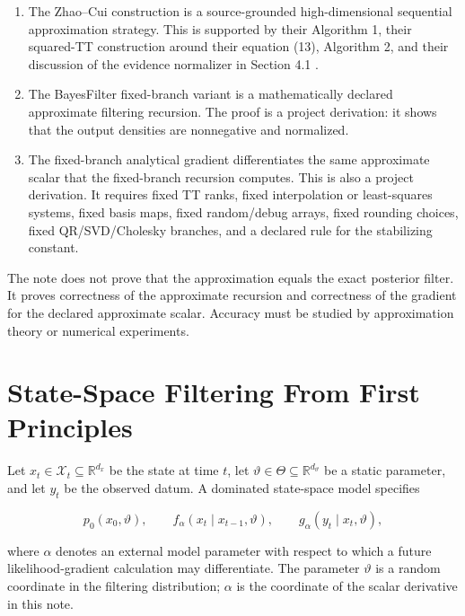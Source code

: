 \documentclass[11pt]{article}
\newcommand{\R}{\mathbb{R}}
\newcommand{\calX}{\mathcal{X}}
\theoremstyle{definition}
\theoremstyle{remark}
\begin{document}
\begin{enumerate}[leftmargin=*]
\item The Zhao--Cui construction is a source-grounded high-dimensional
sequential approximation strategy.  This is supported by their Algorithm 1,
their squared-TT construction around their equation (13), Algorithm 2, and
their discussion of the evidence normalizer in Section 4.1
\cite{zhao-cui-2024}.
\item The BayesFilter fixed-branch variant is a mathematically declared
approximate filtering recursion.  The proof is a project derivation: it shows
that the output densities are nonnegative and normalized.
\item The fixed-branch analytical gradient differentiates the same approximate
scalar that the fixed-branch recursion computes.  This is also a project
derivation.  It requires fixed TT ranks, fixed interpolation or least-squares
systems, fixed basis maps, fixed random/debug arrays, fixed rounding choices,
fixed QR/SVD/Cholesky branches, and a declared rule for the stabilizing
constant.
\end{enumerate}

The note does not prove that the approximation equals the exact posterior
filter.  It proves correctness of the approximate recursion and correctness of
the gradient for the declared approximate scalar.  Accuracy must be studied by
approximation theory or numerical experiments.

\section{State-Space Filtering From First Principles}

Let \(x_t\in\calX_t\subseteq\R^{d_x}\) be the state at time \(t\), let
\(\vartheta\in\Theta\subseteq\R^{d_\vartheta}\) be a static parameter, and let
\(y_t\) be the observed datum.  A dominated state-space model specifies

\[
  p_0(x_0,\vartheta),\qquad
  f_\alpha(x_t\mid x_{t-1},\vartheta),\qquad
  g_\alpha(y_t\mid x_t,\vartheta),
\]

where \(\alpha\) denotes an external model parameter with respect to which a
future likelihood-gradient calculation may differentiate.  The parameter
\(\vartheta\) is a random coordinate in the filtering distribution; \(\alpha\)
is the coordinate of the scalar derivative in this note.
\end{document}
